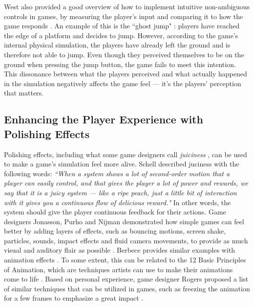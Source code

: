 West also provided a good overview of how to implement intuitive non-ambiguous controls in games, by measuring the player's input and comparing it to how the game responds \cite{intuitive_buttons}. An example of this is the ``ghost jump" \cite{ghostJump, canabalt}: players have reached the edge of a platform and decides to jump. However, according to the game's internal physical simulation, the players have already left the ground and is therefore not able to jump. Even though they perceived themselves to be on the ground when pressing the jump button, the game fails to meet this intention. This dissonance between what the players perceived and what actually happened in the simulation negatively affects the game feel --- it's the players' perception that matters. 


\subsection{Enhancing the Player Experience with Polishing Effects}
Polishing effects, including what some game designers call \textit{juiciness} \cite{juice3}, can be used to make a game's simulation feel more alive. Schell described juciness with the following words: \textit{``When a system shows a lot of second-order motion that a player can easily control, and that gives the player a lot of power and rewards, we say that it is a juicy system --- like a ripe peach, just a little bit of interaction with it gives you a continuous flow of delicious reward."} \cite{schell_art_2008} In other words, the system should give the player continuous feedback for their actions. Game designers Jonasson, Purho and Nijman demonstrated how simple games can feel better by adding layers of effects, such as bouncing motions, screen shake, particles, sounds, impact effects and fluid camera movements, to provide as much visual and auditory flair as possible \cite{juice1, juice2}. Berbece provides similar examples with animation effects \cite{animationSucks}. To some extent, this can be related to the 12 Basic Principles of Animation, which are techniques artists can use to make their animations come to life \cite{animation}. Based on personal experience, game designer Rogers proposed a list of similar techniques that can be utilized in games, such as freezing the animation for a few frames to emphasize a great impact \cite{sticky}.

